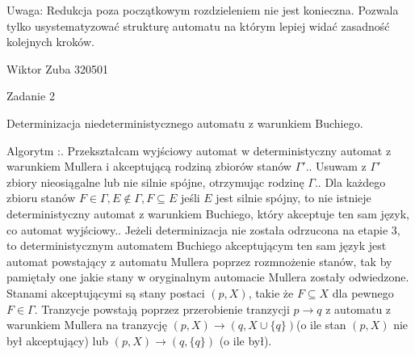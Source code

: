 \documentclass{article}
\begin{document}
Uwaga: Redukcja poza początkowym rozdzieleniem nie jest konieczna.
Pozwala tylko usystematyzować strukturę automatu na którym lepiej widać zasadność kolejnych kroków.\newpage

Wiktor Zuba 320501\newline

Zadanie 2\newline

Determinizacja niedeterministycznego automatu z warunkiem Buchiego.\newline

Algorytm :. Przekształcam wyjściowy automat w deterministyczny automat z warunkiem Mullera i akceptującą rodziną zbiorów stanów $\Gamma'$.. Usuwam z $\Gamma'$ zbiory nieosiągalne lub  nie silnie spójne, otrzymując rodzinę $\Gamma$.. Dla każdego zbioru stanów $F\in\Gamma,E\notin\Gamma,F\subseteq E$ jeśli $E$ jest silnie spójny,
to nie istnieje deterministyczny automat z warunkiem Buchiego, który akceptuje ten sam język, co automat wyjściowy.. Jeżeli determinizacja nie została odrzucona na etapie 3, to deterministycznym automatem Buchiego akceptującym ten sam język
jest automat powstający z automatu Mullera poprzez rozmnożenie stanów, tak by pamiętały one jakie stany w oryginalnym automacie Mullera zostały odwiedzone.
Stanami akceptującymi są stany postaci $(p,X)$, takie że $F\subseteq X$ dla pewnego $F\in\Gamma$.
Tranzycje powstają poprzez przerobienie tranzycji $p\rightarrow q$ z automatu z warunkiem Mullera
na tranzycję $(p,X)\rightarrow (q,X\cup\{q\})$(o ile stan $(p,X)$ nie był akceptujący) lub $(p,X)\rightarrow (q,\{q\})$ (o ile był).\newline
\end{document}
